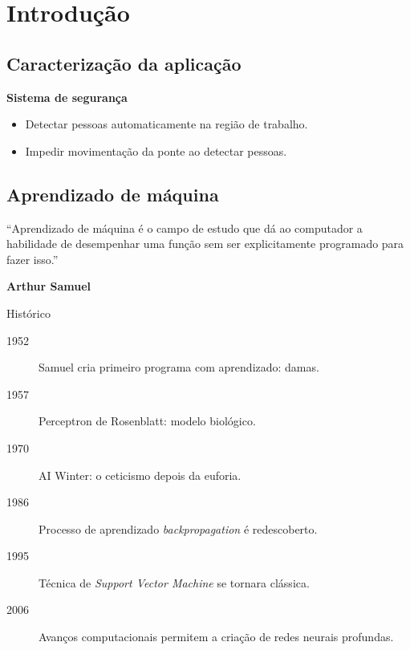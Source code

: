 \section{Introdução}

\subsection{Caracterização da aplicação}
	\begin{frame}{\insertsubsection}
	\end{frame}

	\begin{frame}{\insertsubsection}
	\end{frame}

	\begin{frame}{\insertsubsection}
	\end{frame}

	\begin{frame}{\insertsubsection}
		\textbf{Sistema de segurança}
		\begin{itemize}
			\item Detectar pessoas automaticamente na região de trabalho.
			\item Impedir movimentação da ponte ao detectar pessoas.
		\end{itemize}
	\end{frame}

\subsection{Aprendizado de máquina}
	\begin{frame}{\insertsubsection}
	``Aprendizado de máquina é o campo de estudo que dá ao computador a habilidade de desempenhar uma função sem ser explicitamente programado para fazer isso.''

	\textbf{Arthur Samuel}
	\end{frame}

	\begin{frame}{Histórico}
		\begin{description}
			\item [1952] Samuel cria primeiro programa com aprendizado: damas.
			\item [1957] Perceptron de Rosenblatt: modelo biológico.
			\item [1970] AI Winter: o ceticismo depois da euforia.
			\item [1986] Processo de aprendizado \emph{backpropagation} é redescoberto.
			\item [1995] Técnica de \emph{Support Vector Machine} se tornara clássica.
			\item [2006] Avanços computacionais permitem a criação de redes neurais profundas.
		\end{description}
	\end{frame}

